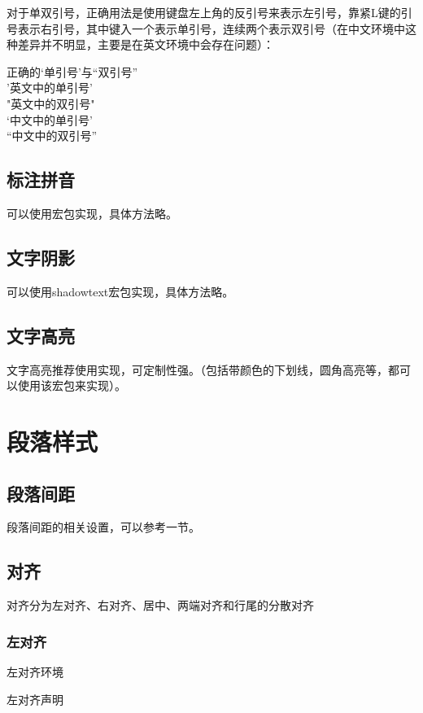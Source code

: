     对于单双引号，正确用法是使用键盘左上角的反引号来表示左引号，靠紧L键的引号表示右引号，其中键入一个表示单引号，连续两个表示双引号（在中文环境中这种差异并不明显，主要是在英文环境中会存在问题）：
    \begin{texshow}
        正确的`单引号'与``双引号''\\
        '英文中的单引号'\\
        "英文中的双引号"\\
        ‘中文中的单引号’\\
        “中文中的双引号”
    \end{texshow}


    \subsection{标注拼音}
    可以使用宏包实现，具体方法略。

    \subsection{文字阴影}
    可以使用shadowtext宏包实现，具体方法略。
    
    \subsection{文字高亮}
    文字高亮推荐使用实现，可定制性强。（包括带颜色的下划线，圆角高亮等，都可以使用该宏包来实现）。

\section{段落样式}\label{sec:段落样式}
    \subsection{段落间距}
    段落间距的相关设置，可以参考一节。

    \subsection{对齐}
    对齐分为左对齐、右对齐、居中、两端对齐和行尾的分散对齐

    \subsubsection{左对齐}
    \begin{texshow}
        \begin{flushleft}
            左对齐环境
        \end{flushleft}        
        \raggedright 左对齐声明
    \end{texshow}
